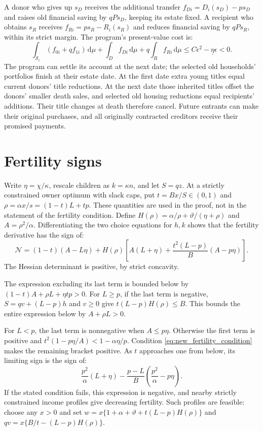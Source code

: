\documentclass[11pt]{article}
\newcommand{\dd}{\mathrm d}
\begin{document}
A donor who gives up $s_D$ receives the additional transfer
$f_{Di}=D_i(s_D)-ps_D$ and raises old financial saving by $qPs_D$, keeping
its estate fixed. A recipient who obtains $s_R$ receives
$f_{Ri}=ps_R-R_i(s_R)$ and reduces financial saving by $qPs_R$, within its
strict margin. The program's present-value cost is:
\begin{equation}
\int_{\mathcal S_\epsilon}(f_{0i}+qf_{1i})\,\dd\mu
+\int_Df_{Di}\,\dd\mu+q\int_Rf_{Ri}\,\dd\mu
\le C\epsilon^2-\underline\eta\epsilon<0.
\end{equation}
The program can settle its account at the next date; the selected old
households' portfolios finish at their estate date. At the first date extra
young titles equal current donors' title reductions. At the next date those
inherited titles offset the donors' smaller death sales, and selected old
housing reductions equal recipients' additions. Their title changes at death
therefore cancel. Future entrants can make their original purchases, and all
originally contracted creditors receive their promised payments.

\section{Fertility signs}
\label{app:new_fertility}

Write $\eta=\chi/\kappa$, rescale children as $k=\kappa n$, and let $S=qz$.
At a strictly constrained owner optimum with slack caps, put
$t=Bx/S\in(0,1)$ and $\rho=\alpha x/s=(1-t)L+tp$.
These quantities are used in the proof, not in the statement of the
fertility condition. Define $H(\rho)=\alpha/\rho+\vartheta/(\eta+\rho)$
and $A=\rho^2/\alpha$. Differentiating the two choice equations for $h,k$
shows that the fertility derivative has the sign of:
\begin{equation}
\mathcal N=(1-t)(A-L\eta)+H(\rho)
\left[A(L+\eta)+\frac{t^2(L-p)}B(A-p\eta)\right].
\label{eq:new_N}
\end{equation}
The Hessian determinant is positive, by strict concavity.

The expression excluding its last term is bounded below by
$(1-t)A+\rho L+\eta tp>0$. For $L\ge p$, if the last term is negative,
$S=qv+(L-p)h$ and $v\ge0$ give $t(L-p)H(\rho)\le B$.
This bounds the entire expression below by $A+\rho L>0$.

For $L<p$, the last term is nonnegative when $A\le p\eta$. Otherwise the
first term is positive and
$t^2(1-p\eta/A)<1-\alpha\eta/p$.
Condition \eqref{eq:new_fertility_condition} makes the remaining bracket
positive. As $t$ approaches one from below, its limiting sign is the sign of:
\begin{equation}
\frac{p^2}{\alpha}(L+\eta)
-\frac{p-L}{B}\left(\frac{p^2}{\alpha}-p\eta\right).
\end{equation}
If the stated condition fails, this expression is negative, and nearby
strictly constrained income profiles give decreasing fertility. Such profiles
are feasible: choose any $x>0$ and set
$w=x\{1+\alpha+\vartheta+t(L-p)H(\rho)\}$ and
$qv=x\{B/t-(L-p)H(\rho)\}$.
\end{document}
